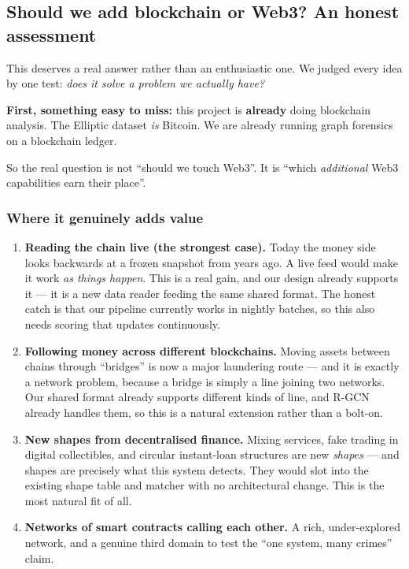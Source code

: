 \documentclass[11pt,a4paper]{article}
\begin{document}
\subsection{Should we add blockchain or Web3? An honest assessment}
\label{sec:web3}

This deserves a real answer rather than an enthusiastic one. We judged every idea
by one test: \emph{does it solve a problem we actually have?}

\begin{keybox}
\textbf{First, something easy to miss:} this project is \textbf{already} doing
blockchain analysis. The Elliptic dataset \emph{is} Bitcoin. We are already
running graph forensics on a blockchain ledger.

So the real question is not ``should we touch Web3''. It is ``which
\emph{additional} Web3 capabilities earn their place''.
\end{keybox}

\subsubsection*{Where it genuinely adds value}

\begin{enumerate}
  \item \textbf{Reading the chain live (the strongest case).} Today the money side
        looks backwards at a frozen snapshot from years ago. A live feed would
        make it work \emph{as things happen}. This is a real gain, and our design
        already supports it --- it is a new data reader feeding the same shared
        format. The honest catch is that our pipeline currently works in nightly
        batches, so this also needs scoring that updates continuously.
  \item \textbf{Following money across different blockchains.} Moving assets
        between chains through ``bridges'' is now a major laundering route --- and
        it is exactly a network problem, because a bridge is simply a line joining
        two networks. Our shared format already supports different kinds of line,
        and R-GCN already handles them, so this is a natural extension rather than
        a bolt-on.
  \item \textbf{New shapes from decentralised finance.} Mixing services, fake
        trading in digital collectibles, and circular instant-loan structures are
        new \emph{shapes} --- and shapes are precisely what this system detects.
        They would slot into the existing shape table and matcher with no
        architectural change. This is the most natural fit of all.
  \item \textbf{Networks of smart contracts calling each other.} A rich,
        under-explored network, and a genuine third domain to test the ``one
        system, many crimes'' claim.
\end{enumerate}
\end{document}
